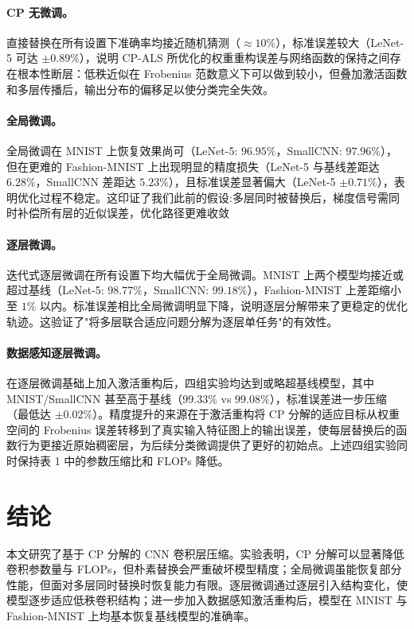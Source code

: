 \documentclass[11pt,a4paper,fontset=fandol]{ctexart}
\begin{document}
\paragraph{CP 无微调。}直接替换在所有设置下准确率均接近随机猜测（$\approx10\%$），标准误差较大（LeNet-5 可达 $\pm0.89\%$），说明 CP-ALS 所优化的权重重构误差与网络函数的保持之间存在根本性断层：低秩近似在 Frobenius 范数意义下可以做到较小，但叠加激活函数和多层传播后，输出分布的偏移足以使分类完全失效。

\paragraph{全局微调。}
全局微调在 MNIST 上恢复效果尚可（LeNet-5: $96.95\%$，SmallCNN: $97.96\%$），但在更难的 Fashion-MNIST 上出现明显的精度损失（LeNet-5 与基线差距达 $6.28\%$，SmallCNN 差距达 $5.23\%$），且标准误差显著偏大（LeNet-5 $\pm0.71\%$），表明优化过程不稳定。这印证了我们此前的假设:多层同时被替换后，梯度信号需同时补偿所有层的近似误差，优化路径更难收敛

\paragraph{逐层微调。}迭代式逐层微调在所有设置下均大幅优于全局微调。MNIST 上两个模型均接近或超过基线（LeNet-5: $98.77\%$，SmallCNN: $99.18\%$），Fashion-MNIST 上差距缩小至 $1\%$ 以内。标准误差相比全局微调明显下降，说明逐层分解带来了更稳定的优化轨迹。这验证了"将多层联合适应问题分解为逐层单任务"的有效性。

\paragraph{数据感知逐层微调。}在逐层微调基础上加入激活重构后，四组实验均达到或略超基线模型，其中 MNIST/SmallCNN 甚至高于基线（$99.33\%$ vs $99.08\%$），标准误差进一步压缩（最低达 $\pm0.02\%$）。精度提升的来源在于激活重构将 CP 分解的适应目标从权重空间的 Frobenius 误差转移到了真实输入特征图上的输出误差，使每层替换后的函数行为更接近原始稠密层，为后续分类微调提供了更好的初始点。上述四组实验同时保持表 1 中的参数压缩比和 FLOPs 降低。

\section{结论}
本文研究了基于 CP 分解的 CNN 卷积层压缩。实验表明，CP 分解可以显著降低卷积参数量与 FLOPs，但朴素替换会严重破坏模型精度；全局微调虽能恢复部分性能，但面对多层同时替换时恢复能力有限。逐层微调通过逐层引入结构变化，使模型逐步适应低秩卷积结构；进一步加入数据感知激活重构后，模型在 MNIST 与 Fashion-MNIST 上均基本恢复基线模型的准确率。
\end{document}
